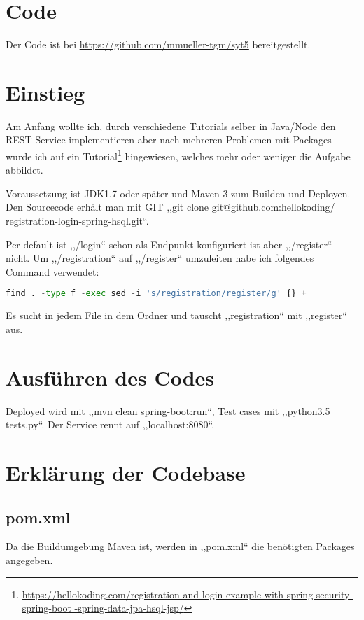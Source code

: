 \section{Code}
Der Code ist bei \href{https://github.com/mmueller-tgm/syt5}{https://github.com/mmueller-tgm/syt5} bereitgestellt.
\section{Einstieg}
Am Anfang wollte ich, durch verschiedene Tutorials selber in Java/Node den REST
 Service implementieren aber nach mehreren Problemen mit Packages wurde ich auf
 ein Tutorial\footnote{\href{https://hellokoding.com/registration-and-login-example-with-spring-security-spring-boot-spring-data-jpa-hsql-jsp/}{https://hellokoding.com/registration-and-login-example-with-spring-security-spring-boot
-spring-data-jpa-hsql-jsp/}} hingewiesen, welches mehr oder weniger die Aufgabe
 abbildet.

Voraussetzung ist JDK1.7 oder später und Maven 3 zum Builden und Deployen.
Den Sourcecode erhält man mit GIT ,,git clone git@github.com:hellokoding/
registration-login-spring-hsql.git``. 

Per default ist ,,/login`` schon als Endpunkt konfiguriert ist aber ,,/register``
 nicht. Um ,,/registration`` auf ,,/register`` umzuleiten habe ich folgendes
 Command verwendet:
\begin{lstlisting}[language=Python]
	find . -type f -exec sed -i 's/registration/register/g' {} +
\end{lstlisting}
Es sucht in jedem File in dem Ordner und tauscht ,,registration`` mit
 ,,register`` aus.
 
\section{Ausf\"uhren des Codes}
Deployed wird mit ,,mvn clean spring-boot:run``, Test cases mit ,,python3.5 tests.py``. Der Service rennt auf ,,localhost:8080``.
 
\section{Erkl\"arung der Codebase}
\subsection{pom.xml}
Da die Buildumgebung Maven ist, werden in ,,pom.xml`` die benötigten Packages angegeben.

